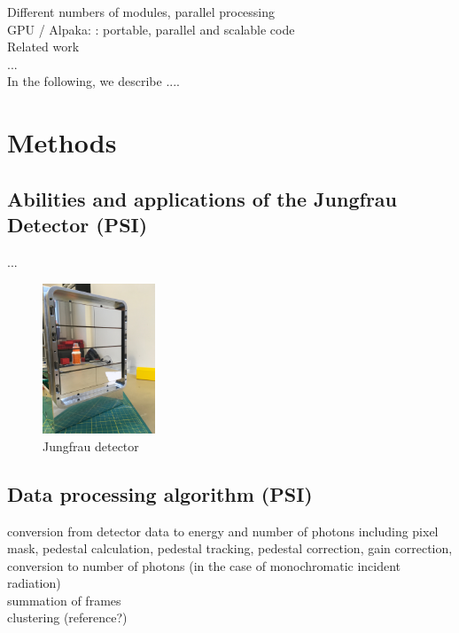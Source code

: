 \documentclass[a4paper]{article}
\begin{document}
Different numbers of modules, parallel processing\\
	
GPU / Alpaka: \cite{Matthes17}: portable, parallel and scalable code\\

Related work\\

...\\

In the following, we describe ....\\


\section{Methods}
\subsection{Abilities and applications of the Jungfrau Detector (PSI)}

...




\begin{figure}[h!]
\centering
\includegraphics[width=0.30\textwidth]{jungfraudetector.jpg}
\caption{Jungfrau detector}
\label{fig:jfdetector}
\end{figure}


\subsection{Data processing algorithm (PSI)}
conversion from detector data to energy and number of photons including pixel mask, pedestal calculation, pedestal tracking, pedestal correction, gain correction, conversion to number of photons (in the case of monochromatic incident radiation)\\

 summation of frames\\

 clustering (reference?)\\
\end{document}
